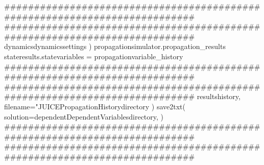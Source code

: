 {}###########################################################################\markdownRendererInterblockSeparator
{}
\markdownRendererSectionEnd \markdownRendererSectionBegin
{}\markdownRendererInterblockSeparator
{}###########################################################################\markdownRendererInterblockSeparator
{}
\markdownRendererSectionEnd \markdownRendererSectionBegin
{}\markdownRendererInterblockSeparator
{}dynamicsdynamicssettings )\markdownRendererInterblockSeparator
{}
\markdownRendererSectionEnd \markdownRendererSectionBegin
{}\markdownRendererInterblockSeparator
{}propagationsimulator.propagation_results\markdownRendererInterblockSeparator
{}
\markdownRendererSectionEnd \markdownRendererSectionBegin
{}\markdownRendererInterblockSeparator
{}stateresults.statevariables = propagationvariable_history\markdownRendererInterblockSeparator
{}###########################################################################\markdownRendererInterblockSeparator
{}
\markdownRendererSectionEnd \markdownRendererSectionBegin
{}\markdownRendererInterblockSeparator
{}########################################################################### resultshistory, filename="JUICEPropagationHistorydirectory ) save2txt( solution=dependentDependentVariablesdirectory, )\markdownRendererInterblockSeparator
{}###########################################################################\markdownRendererInterblockSeparator
{}
\markdownRendererSectionEnd \markdownRendererSectionBegin
{}\markdownRendererInterblockSeparator
{}###########################################################################\markdownRendererInterblockSeparator
{}
\markdownRendererSectionEnd \markdownRendererSectionBegin
{}\markdownRendererInterblockSeparator
